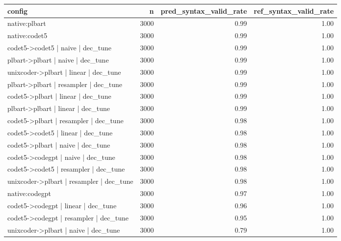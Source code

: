 \begin{tabular}{lrrr}
\toprule
config & n & pred_syntax_valid_rate & ref_syntax_valid_rate \\
\midrule
native:plbart & 3000 & 0.99 & 1.00 \\
native:codet5 & 3000 & 0.99 & 1.00 \\
codet5->codet5 | naive | dec_tune & 3000 & 0.99 & 1.00 \\
plbart->plbart | naive | dec_tune & 3000 & 0.99 & 1.00 \\
unixcoder->plbart | linear | dec_tune & 3000 & 0.99 & 1.00 \\
plbart->plbart | resampler | dec_tune & 3000 & 0.99 & 1.00 \\
codet5->plbart | linear | dec_tune & 3000 & 0.99 & 1.00 \\
plbart->plbart | linear | dec_tune & 3000 & 0.99 & 1.00 \\
codet5->plbart | resampler | dec_tune & 3000 & 0.98 & 1.00 \\
codet5->codet5 | linear | dec_tune & 3000 & 0.98 & 1.00 \\
codet5->plbart | naive | dec_tune & 3000 & 0.98 & 1.00 \\
codet5->codegpt | naive | dec_tune & 3000 & 0.98 & 1.00 \\
codet5->codet5 | resampler | dec_tune & 3000 & 0.98 & 1.00 \\
unixcoder->plbart | resampler | dec_tune & 3000 & 0.98 & 1.00 \\
native:codegpt & 3000 & 0.97 & 1.00 \\
codet5->codegpt | linear | dec_tune & 3000 & 0.96 & 1.00 \\
codet5->codegpt | resampler | dec_tune & 3000 & 0.95 & 1.00 \\
unixcoder->plbart | naive | dec_tune & 3000 & 0.79 & 1.00 \\
\bottomrule
\end{tabular}
